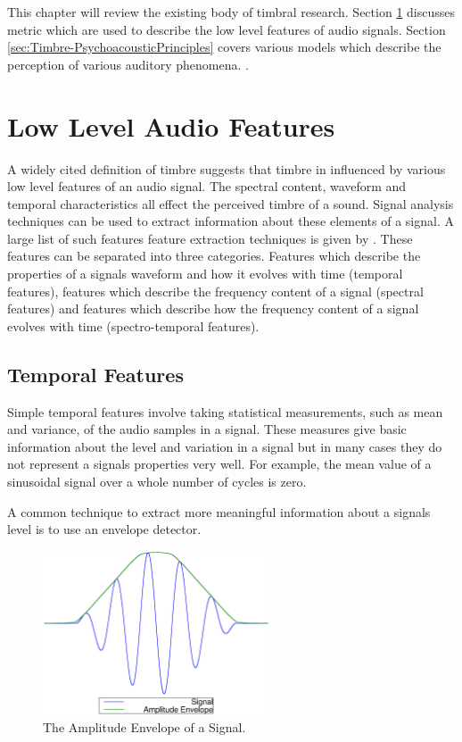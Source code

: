 	This chapter will review the existing body of timbral research. Section \ref{sec:Timbre-LowLevelFeatures} discusses
	metric which are used to describe the low level features of audio signals. Section
	\ref{sec:Timbre-PsychoacousticPrinciples} covers various models which describe the perception of various auditory
	phenomena. .

\section{Low Level Audio Features}
\label{sec:Timbre-LowLevelFeatures}
	A widely cited definition of timbre \citep{ASA1960american} suggests that timbre in influenced by various low level
	features of an audio signal. The spectral content, waveform and temporal characteristics all effect the perceived
	timbre of a sound. Signal analysis techniques can be used to extract information about these elements of a signal.
	A large list of such features feature extraction techniques is given by \citep{peeters2004a}. These features can be
	separated into three categories. Features which describe the properties of a signals waveform and how it evolves
	with time (temporal features), features which describe the frequency content of a signal (spectral features) and
	features which describe how the frequency content of a signal evolves with time (spectro-temporal features).

	\subsection{Temporal Features}
	\label{sec:Timbre-LowLevelFeatures-Temporal}
		Simple temporal features involve taking statistical measurements, such as mean and variance, of the audio
		samples in a signal. These measures give basic information about the level and variation in a signal but in
		many cases they do not represent a signals properties very well. For example, the mean value of a sinusoidal
		signal over a whole number of cycles is zero. 

		A common technique to extract more meaningful information about a signals level is to use an envelope
		detector. 

		\begin{figure}[h!]
			\centering
			\includegraphics[width=0.6\textwidth]{chapter2/Images/AmplitudeEnvelope.eps}
			\caption{The Amplitude Envelope of a Signal.}
			\label{fig:AmplitudeEnvelope}
		\end{figure}

